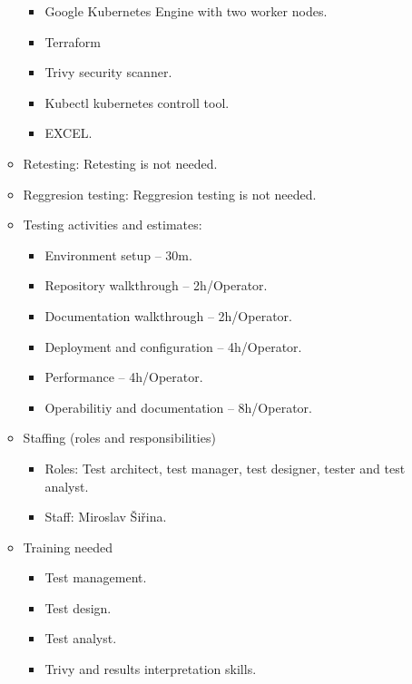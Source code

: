 \begin{itemize}
\begin{itemize}
\begin{itemize}
                        \item Google Kubernetes Engine with two worker nodes.
                        \item Terraform
                        \item Trivy security scanner.
                        \item Kubectl kubernetes controll tool.
                        \item EXCEL.
                    \end{itemize}
              \item Retesting: Retesting is not needed.
              \item Reggresion testing: Reggresion testing is not needed.
              \item Testing activities and estimates:
                    \begin{itemize}
                        \item Environment setup – 30m.
                        \item Repository walkthrough – 2h/Operator.
                        \item Documentation walkthrough – 2h/Operator.
                        \item Deployment and configuration – 4h/Operator.
                        \item Performance – 4h/Operator.
                        \item Operabilitiy and documentation – 8h/Operator.
                    \end{itemize}
              \item Staffing (roles and responsibilities)
                    \begin{itemize}
                        \item Roles: Test architect, test manager, test designer, tester and test analyst.
                        \item Staff: Miroslav Šiřina.
                    \end{itemize}
              \item Training needed
                    \begin{itemize}
                        \item Test management.
                        \item Test design.
                        \item Test analyst.
                        \item Trivy and results interpretation skills.

\end{itemize}
\end{itemize}
\end{itemize}

